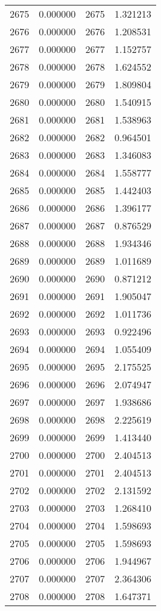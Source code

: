 \documentclass[12pt]{article}
\begin{document}
\begin{longtable}{@{}cccc@{}}
2675 & 0.000000 & 2675 & 1.321213 \\
2676 & 0.000000 & 2676 & 1.208531 \\
2677 & 0.000000 & 2677 & 1.152757 \\
2678 & 0.000000 & 2678 & 1.624552 \\
2679 & 0.000000 & 2679 & 1.809804 \\
2680 & 0.000000 & 2680 & 1.540915 \\
2681 & 0.000000 & 2681 & 1.538963 \\
2682 & 0.000000 & 2682 & 0.964501 \\
2683 & 0.000000 & 2683 & 1.346083 \\
2684 & 0.000000 & 2684 & 1.558777 \\
2685 & 0.000000 & 2685 & 1.442403 \\
2686 & 0.000000 & 2686 & 1.396177 \\
2687 & 0.000000 & 2687 & 0.876529 \\
2688 & 0.000000 & 2688 & 1.934346 \\
2689 & 0.000000 & 2689 & 1.011689 \\
2690 & 0.000000 & 2690 & 0.871212 \\
2691 & 0.000000 & 2691 & 1.905047 \\
2692 & 0.000000 & 2692 & 1.011736 \\
2693 & 0.000000 & 2693 & 0.922496 \\
2694 & 0.000000 & 2694 & 1.055409 \\
2695 & 0.000000 & 2695 & 2.175525 \\
2696 & 0.000000 & 2696 & 2.074947 \\
2697 & 0.000000 & 2697 & 1.938686 \\
2698 & 0.000000 & 2698 & 2.225619 \\
2699 & 0.000000 & 2699 & 1.413440 \\
2700 & 0.000000 & 2700 & 2.404513 \\
2701 & 0.000000 & 2701 & 2.404513 \\
2702 & 0.000000 & 2702 & 2.131592 \\
2703 & 0.000000 & 2703 & 1.268410 \\
2704 & 0.000000 & 2704 & 1.598693 \\
2705 & 0.000000 & 2705 & 1.598693 \\
2706 & 0.000000 & 2706 & 1.944967 \\
2707 & 0.000000 & 2707 & 2.364306 \\
2708 & 0.000000 & 2708 & 1.647371 \\

\end{longtable}
\end{document}

